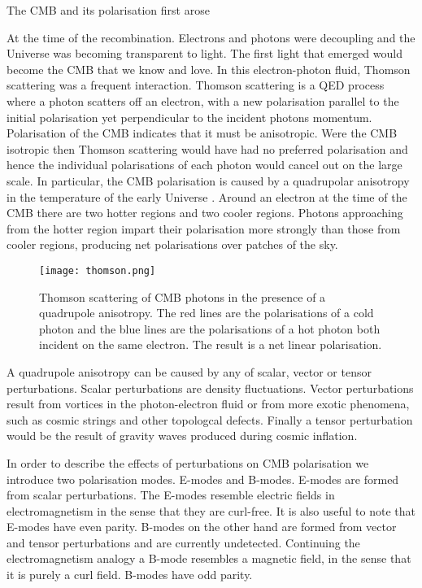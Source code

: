 The CMB and its polarisation first arose 

At the time of the recombination. Electrons and photons were decoupling and the Universe was becoming transparent to light. The first light that emerged would become the CMB that we know and love. In this electron-photon fluid, Thomson scattering was a frequent interaction. Thomson scattering is a QED process where a photon scatters off an electron, with a new polarisation parallel to the initial polarisation yet perpendicular to the incident photons momentum.
	Polarisation of the CMB indicates that it must be anisotropic. Were the CMB isotropic then Thomson scattering would have had no preferred polarisation and hence the individual polarisations of each photon would cancel out on the large scale. In particular, the CMB polarisation is caused by a quadrupolar anisotropy in the temperature of the early Universe \cite{Hu:1997hv}. Around an electron at the time of the CMB there are two hotter regions and two cooler regions. Photons approaching from the hotter region impart their polarisation more strongly than those from cooler regions, producing net polarisations over patches of the sky.

\begin{figure}[h]
\centering
\texttt{[image: thomson.png]}
\caption{Thomson scattering of CMB photons in the presence of a quadrupole anisotropy. The red lines are the polarisations of a cold photon and the blue lines are the polarisations of a hot photon both incident on the same electron. The result is a net linear polarisation.}
\label{fig:thomson}
\end{figure}
\pagebreak
A quadrupole anisotropy can be caused by any of scalar, vector or tensor perturbations. Scalar perturbations are density fluctuations. Vector perturbations result from vortices in the photon-electron fluid or from more exotic phenomena, such as cosmic strings and other topologcal defects. Finally a tensor perturbation would be the result of gravity waves produced during cosmic inflation.  

In order to describe the effects of perturbations on CMB polarisation we introduce two polarisation modes. E-modes and B-modes. E-modes are formed from scalar perturbations. The E-modes resemble electric fields in electromagnetism in the sense that they are curl-free. It is also useful to note that E-modes have even parity. B-modes on the other hand are formed from vector and tensor perturbations and are currently undetected. Continuing the electromagnetism analogy a B-mode resembles a magnetic field, in the sense that it is purely a curl field. B-modes have odd parity.

